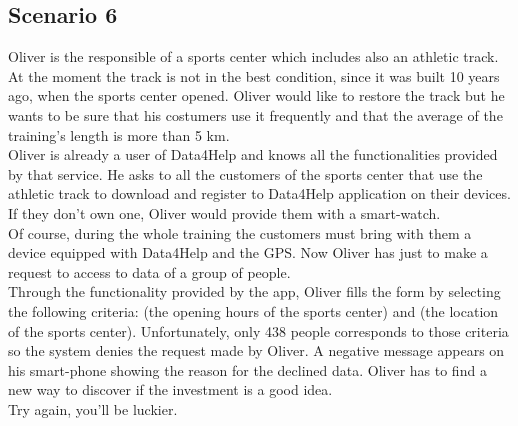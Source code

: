     \subsection{Scenario 6}
    Oliver is the responsible of a sports center which includes also an athletic track.
    At the moment the track is not in the best condition, since it was built 10 years ago, when the sports center opened.
    Oliver would like to restore the track but he wants to be sure that his costumers use it frequently and that the average of the training's length is more than 5 km. \\
    Oliver is already a user of Data4Help and knows all the functionalities provided by that service. He asks to all the customers of the sports center that use the athletic track to download and register to Data4Help application on their devices. If they don't own one, Oliver would provide them with a smart-watch. \\
    Of course, during the whole training the customers must bring with them a device equipped with Data4Help and the GPS.
    Now Oliver has just to make a request to access to data of a group of people. \\
    Through the functionality provided by the app, Oliver fills the form by selecting the following criteria:  (the opening hours of the sports center) and  (the location of the sports center).
    Unfortunately, only 438 people corresponds to those criteria so the system denies the request made by Oliver.
    A negative message appears on his smart-phone showing the reason for the declined data.
    Oliver has to find a new way to discover if the investment is a good idea. \\
    Try again, you'll be luckier.

